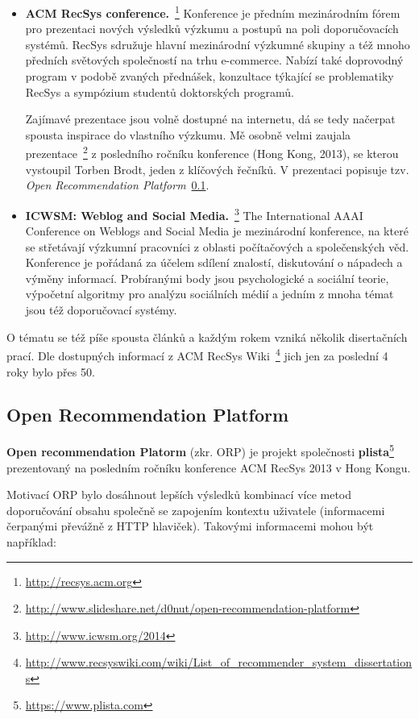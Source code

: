\documentclass[thesis=M,czech]{FITthesis}[2014/05/07]
\begin{document}
\begin{itemize}
  \item \textbf{ACM RecSys conference.}~\footnote{\url{http://recsys.acm.org}} Konference je předním mezinárodním fórem pro prezentaci nových výsledků výzkumu a postupů na poli doporučovacích systémů. RecSys sdružuje hlavní mezinárodní výzkumné skupiny a též mnoho předních světových společností na trhu e-commerce. Nabízí také doprovodný program v podobě zvaných přednášek, konzultace týkající se problematiky RecSys a sympózium studentů doktorských programů. 
  
  Zajímavé prezentace jsou volně dostupné na internetu, dá se tedy načerpat spousta inspirace do vlastního výzkumu. Mě osobně velmi zaujala prezentace~\footnote{\url{http://www.slideshare.net/d0nut/open-recommendation-platform}} z posledního ročníku konference (Hong Kong, 2013), se kterou vystoupil Torben Brodt, jeden z klíčových řečníků. V prezentaci popisuje tzv. \emph{Open Recommendation Platform}~\ref{sub:orp}. 
  
  \item \textbf{ICWSM: Weblog and Social Media.}~\footnote{\url{http://www.icwsm.org/2014}} The International AAAI Conference on Weblogs and Social Media je mezinárodní konference, na které se střetávají výzkumní pracovníci z oblasti počítačových a společenských věd. Konference je pořádaná za účelem sdílení znalostí, diskutování o nápadech a výměny informací. Probíranými body jsou psychologické a sociální teorie, výpočetní algoritmy pro analýzu sociálních médií a jedním z mnoha témat jsou též doporučovací systémy.
\end{itemize}

O tématu se též píše spousta článků a každým rokem vzniká několik disertačních prací. Dle dostupných informací z ACM RecSys Wiki~\footnote{\url{http://www.recsyswiki.com/wiki/List_of_recommender_system_dissertations}} jich jen za poslední 4 roky bylo přes 50.

\subsection{Open Recommendation Platform}
\label{sub:orp}
\textbf{Open recommendation Platorm} (zkr. ORP) je projekt společnosti \textbf{plista}\footnote{\url{https://www.plista.com}} prezentovaný na posledním ročníku konference ACM RecSys 2013 v Hong Kongu. 

Motivací ORP bylo dosáhnout lepších výsledků kombinací více metod doporučování obsahu společně se zapojením kontextu uživatele (informacemi čerpanými převážně z HTTP hlaviček). Takovými informacemi mohou být například:
\end{document}
